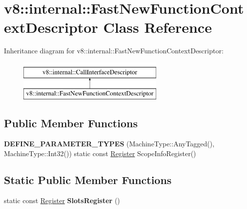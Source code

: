 \hypertarget{classv8_1_1internal_1_1FastNewFunctionContextDescriptor}{}\section{v8\+:\+:internal\+:\+:Fast\+New\+Function\+Context\+Descriptor Class Reference}
\label{classv8_1_1internal_1_1FastNewFunctionContextDescriptor}
Inheritance diagram for v8\+:\+:internal\+:\+:Fast\+New\+Function\+Context\+Descriptor\+:\begin{figure}[H]
\begin{center}
\leavevmode
\includegraphics[height=2.000000cm]{classv8_1_1internal_1_1FastNewFunctionContextDescriptor}
\end{center}
\end{figure}
\subsection*{Public Member Functions}
\begin{DoxyCompactItemize}
\item 
\mbox{\label{classv8_1_1internal_1_1FastNewFunctionContextDescriptor_abe378dedac1b93e414a81f6468b44672}} 
{\bfseries D\+E\+F\+I\+N\+E\+\_\+\+P\+A\+R\+A\+M\+E\+T\+E\+R\+\_\+\+T\+Y\+P\+ES} (Machine\+Type\+::\+Any\+Tagged(), Machine\+Type\+::\+Int32()) static const \mbox{\hyperlink{classv8_1_1internal_1_1Register}{Register}} Scope\+Info\+Register()
\end{DoxyCompactItemize}
\subsection*{Static Public Member Functions}
\begin{DoxyCompactItemize}
\item 
\mbox{\label{classv8_1_1internal_1_1FastNewFunctionContextDescriptor_a4a691eff169c2ac5115311e31fd6f588}} 
static const \mbox{\hyperlink{classv8_1_1internal_1_1Register}{Register}} {\bfseries Slots\+Register} ()
\end{DoxyCompactItemize}
